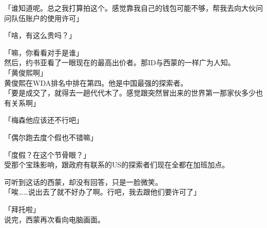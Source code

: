 「谁知道呢。总之我打算拍这个。感觉靠我自己的钱包可能不够，帮我去向大伙问问队伍账户的使用许可」

「啥，有这么贵吗？」

「嘛，你看看对手是谁」\\

然后，约书亚看了一眼现在的最高出价者。那ID与西蒙的一样广为人知。\\

「黄俊熙啊」\\

黄俊熙在WDA排名中排在第四。他是中国最强的探索者。\\

「要是成交了，就得去一趟代代木了。感觉跟突然冒出来的世界第一那家伙多少也有关系啊」

「梅森他应该还不行吧」

「偶尔跑去度个假也不错嘛」

「度假？在这个节骨眼？」\\

受那个宝珠影响，跟政府有联系的US的探索者们现在全都在加班加点。

可听到这话的西蒙，却没有回答，只是一脸微笑。\\

「唉……说出去了就不好办了啊。行吧，我去跟他们要许可了」

「拜托啦」\\

说完，西蒙再次看向电脑画面。\\
